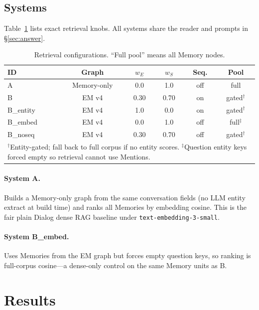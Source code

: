 \documentclass[11pt]{article}
\begin{document}
\subsection{Systems}
\label{sec:systems}

Table~\ref{tab:systems} lists exact retrieval knobs.
All systems share the reader and prompts in \S\ref{sec:answer}.

\begin{table}[t]
\centering
\small
\caption{Retrieval configurations. ``Full pool'' means all Memory nodes.}
\label{tab:systems}
\begin{tabular}{lccccc}
\toprule
ID & Graph & $w_E$ & $w_S$ & Seq. & Pool \\
\midrule
A & Memory-only & 0.0 & 1.0 & off & full \\
B & EM v4 & 0.30 & 0.70 & on & gated$^\dagger$ \\
B\_entity & EM v4 & 1.0 & 0.0 & on & gated$^\dagger$ \\
B\_embed & EM v4 & 0.0 & 1.0 & off & full$^\ddagger$ \\
B\_noseq & EM v4 & 0.30 & 0.70 & off & gated$^\dagger$ \\
\bottomrule
\multicolumn{6}{p{0.95\linewidth}}{\footnotesize $^\dagger$Entity-gated; fall back to full corpus if no entity scores.
$^\ddagger$Question entity keys forced empty so retrieval cannot use Mentions.}
\end{tabular}
\end{table}

\paragraph{System A.}
Builds a Memory-only graph from the same conversation fields (no LLM entity extract at build time) and ranks all Memories by embedding cosine.
This is the fair plain Dialog dense RAG baseline under \texttt{text-embedding-3-small}.

\paragraph{System B\_embed.}
Uses Memories from the EM graph but forces empty question keys, so ranking is full-corpus cosine---a dense-only control on the same Memory units as B.

\section{Results}
\label{sec:results}
\end{document}
